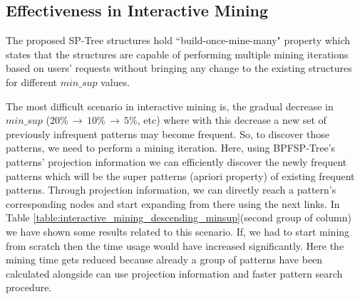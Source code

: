 \subsection{Effectiveness in Interactive Mining}
The proposed SP-Tree structures hold ``build-once-mine-many" property which states that the structures are capable of performing multiple mining iterations based on users' requests without bringing any change to the existing structures for different $min\_sup$ values.

The most difficult scenario in interactive mining is, the gradual decrease in $min\_sup$  ($20\% \,\to\, 10\% \,\to\, 5\%$, etc) where with this decrease a new set of previously infrequent patterns may become frequent. So, to discover those patterns, we need to perform a mining iteration. Here, using BPFSP-Tree's patterns' projection information we can efficiently discover the newly frequent patterns which will be the super patterns (apriori property) of existing frequent patterns. Through projection information, we can directly reach a pattern's corresponding nodes and start expanding from there using the next links. In Table \ref{table:interactive_mining_descending_minsup}(second group of column) we have shown some results related to this scenario. If, we had to start mining from scratch then the time usage would have increased significantly. Here the mining time gets reduced because already a group of patterns have been calculated alongside can use projection information and faster pattern search procedure.


